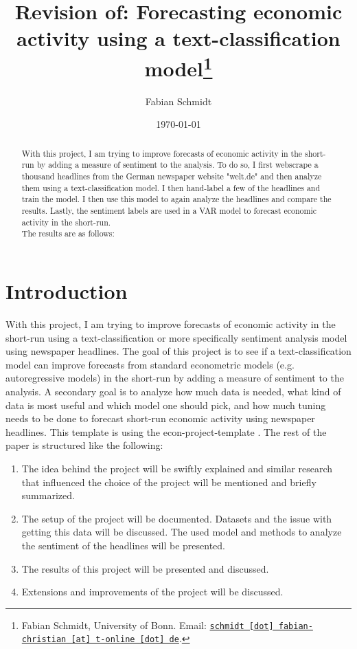 \documentclass[11pt, a4paper, leqno]{article}
\begin{document}
\title{Revision of: Forecasting economic activity using a text-classification model\thanks{Fabian Schmidt, University of Bonn. Email: \href{mailto:schmidt.fabian-christian@t-online.de}{\nolinkurl{schmidt [dot] fabian-christian [at] t-online [dot] de}}.}}

\author{Fabian Schmidt}

\date{
    \today
}

\maketitle


\begin{abstract}
    With this project, I am trying to improve forecasts of economic activity in the short-run by adding a measure of sentiment to the analysis. To do so, I first webscrape a thousand headlines from the German newspaper website "welt.de" and then analyze them using a text-classification model.
    I then hand-label a few of the headlines and train the model. I then use this model to again analyze the headlines and compare the results. Lastly, the sentiment labels are used in a VAR model to forecast economic activity in the short-run.\\
    The results are as follows:
\end{abstract}

\clearpage


\section{Introduction} %
\label{sec:introduction}

With this project, I am trying to improve forecasts of economic activity in the short-run using a text-classification or more specifically sentiment analysis model using newspaper headlines. The goal of this project is to see if a text-classification model can improve forecasts from standard econometric models (e.g. autoregressive models) in the short-run by adding a measure of sentiment to the analysis. 
A secondary goal is to analyze how much data is needed, what kind of data is most useful and which model one should pick, and how much tuning needs to be done to forecast short-run economic activity using newspaper headlines.
This template is using the econ-project-template \citet{Gaudecker2023}.
The rest of the paper is structured like the following:
\begin{enumerate}
    \item The idea behind the project will be swiftly explained and similar research that influenced the choice of the project will be mentioned and briefly summarized.
    \item The setup of the project will be documented. Datasets and the issue with getting this data will be discussed. The used model and methods to analyze the sentiment of the headlines will be presented.
    \item The results of this project will be presented and discussed.
    \item Extensions and improvements of the project will be discussed.
\end{enumerate}
\end{document}
